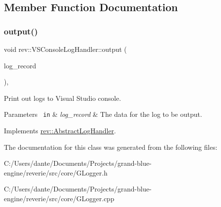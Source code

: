 \subsection{Member Function Documentation}
\mbox{\label{classrev_1_1_v_s_console_log_handler_abfe9a50069f8bb12d43a00c7e5f541e8}} 
\subsubsection{\texorpdfstring{output()}{output()}}
{\footnotesize\ttfamily void rev\+::\+V\+S\+Console\+Log\+Handler\+::output (\begin{DoxyParamCaption}\item[{\mbox{\hyperlink{classrev_1_1_log_record}{Log\+Record}} \&}]{log\+\_\+record }\end{DoxyParamCaption})\hspace{0.3cm}{\ttfamily [override]}, {\ttfamily [virtual]}}



Print out logs to Visual Studio console. 


\begin{DoxyParams}[1]{Parameters}
\mbox{\texttt{ in}}  & {\em log\+\_\+record} & The data for the log to be output. \\
\hline
\end{DoxyParams}


Implements \mbox{\hyperlink{classrev_1_1_abstract_log_handler_a0154255c9435f0ee66975be2d450b177}{rev\+::\+Abstract\+Log\+Handler}}.



The documentation for this class was generated from the following files\+:\begin{DoxyCompactItemize}
\item 
C\+:/\+Users/dante/\+Documents/\+Projects/grand-\/blue-\/engine/reverie/src/core/G\+Logger.\+h\item 
C\+:/\+Users/dante/\+Documents/\+Projects/grand-\/blue-\/engine/reverie/src/core/G\+Logger.\+cpp\end{DoxyCompactItemize}
